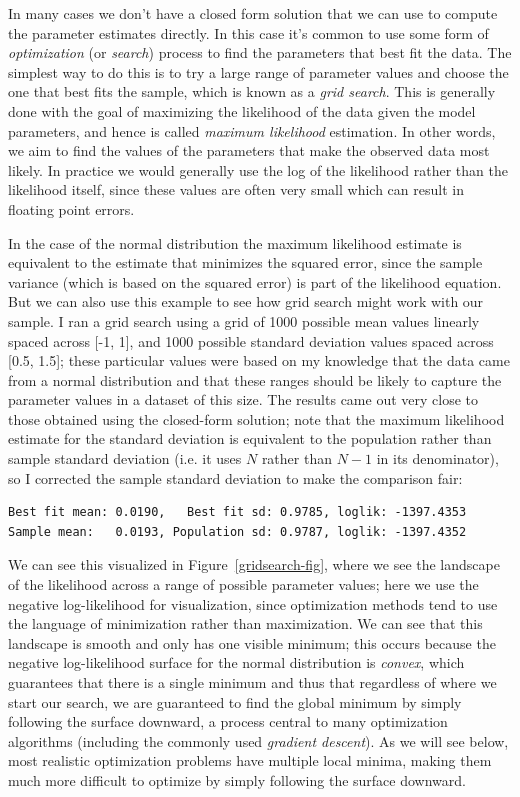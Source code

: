 In many cases we don't have a closed form solution that we can use to compute the parameter estimates directly. In this case it's common to use some form of \textit{optimization} (or \textit{search}) process to find the parameters that best fit the data.  The simplest way to do this is to try a large range of parameter values and choose the one that best fits the sample, which is known as a \textit{grid search}.  This is generally done with the goal of maximizing the likelihood of the data given the model parameters, and hence is called \textit{maximum likelihood} estimation. In other words, we aim to find the values of the parameters that make the observed data most likely. In practice we would generally use the log of the likelihood rather than the likelihood itself, since these values are often very small which can result in floating point errors.

In the case of the normal distribution the maximum likelihood estimate is equivalent to the estimate that minimizes the squared error, since the sample variance (which is based on the squared error) is part of the likelihood equation.  But we can also use this example to see how grid search might work with our sample.  I ran a grid search using a grid of 1000 possible mean values linearly spaced across [-1, 1], and 1000 possible standard deviation values spaced across [0.5, 1.5]; these particular values were based on my knowledge that the data came from a normal distribution and that these ranges should be likely to capture the parameter values in a dataset of this size.  The results came out very close to those obtained using the closed-form solution; note that the maximum likelihood estimate for the standard deviation is equivalent to the population rather than sample standard deviation (i.e. it uses $N$ rather than $N - 1$ in its denominator), so I corrected the sample standard deviation to make the comparison fair:

\begin{lstlisting}[style=shell]
Best fit mean: 0.0190,   Best fit sd: 0.9785, loglik: -1397.4353
Sample mean:   0.0193, Population sd: 0.9787, loglik: -1397.4352
\end{lstlisting}

We can see this visualized in Figure~\ref{gridsearch-fig}, where we see the landscape of the likelihood across a range of possible parameter values; here we use the negative log-likelihood for visualization, since optimization methods tend to use the language of minimization rather than maximization. We can see that this landscape is smooth and only has one visible minimum; this occurs because the negative log-likelihood surface for the normal distribution is \textit{convex}, which guarantees that there is a single minimum and thus that regardless of where we start our search, we are guaranteed to find the global minimum by simply following the surface downward, a process central to many optimization algorithms (including the commonly used \textit{gradient descent}). As we will see below, most realistic optimization problems have multiple local minima, making them much more difficult to optimize by simply following the surface downward.

